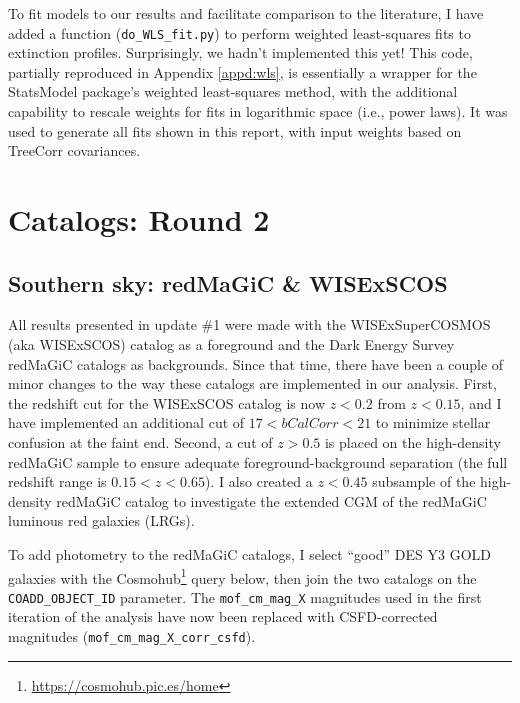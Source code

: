 \documentclass[11pt, oneside]{article}   	%
\begin{document}
To fit models to our results and facilitate comparison to the literature, I have added a function (\texttt{do\_WLS\_fit.py}) to perform weighted least-squares fits to extinction profiles. Surprisingly, we hadn't implemented this yet! This code, partially reproduced in Appendix \ref{appd:wls}, is essentially a wrapper for the StatsModel package's weighted least-squares method, with the additional capability to rescale weights for fits in logarithmic space (i.e., power laws). It was used to generate all fits shown in this report, with input weights based on TreeCorr covariances.



\section{Catalogs: Round 2}\label{sec:catalogs}

\subsection{Southern sky: redMaGiC \& WISExSCOS}
All results presented in update \#1 were made with the WISExSuperCOSMOS (aka WISExSCOS) catalog as a foreground and the Dark Energy Survey redMaGiC catalogs \cite{2016MNRAS.461.1431R} as backgrounds. Since that time, there have been a couple of minor changes to the way these catalogs are implemented in our analysis. First, the redshift cut for the WISExSCOS catalog is now $z < 0.2$ from $z < 0.15$, and I have implemented an additional cut of $17 < bCalCorr < 21$ to minimize stellar confusion at the faint end. Second, a cut of $z > 0.5$ is placed on the high-density redMaGiC sample to ensure adequate foreground-background separation (the full redshift range is $0.15 < z < 0.65$). I also created a $z < 0.45$ subsample of the high-density redMaGiC catalog to investigate the extended CGM of the redMaGiC luminous red galaxies (LRGs).

To add photometry to the redMaGiC catalogs, I select ``good'' DES Y3 GOLD galaxies with the {Cosmohub}\footnote{\url{https://cosmohub.pic.es/home}} \cite{2017ehep.confE.488C,TALLADA2020100391} query below, then join the two catalogs on the \texttt{COADD\_OBJECT\_ID} parameter. The \texttt{mof\_cm\_mag\_X} magnitudes used in the first iteration of the analysis have now been replaced with CSFD-corrected magnitudes (\texttt{mof\_cm\_mag\_X\_corr\_csfd}).
\end{document}
